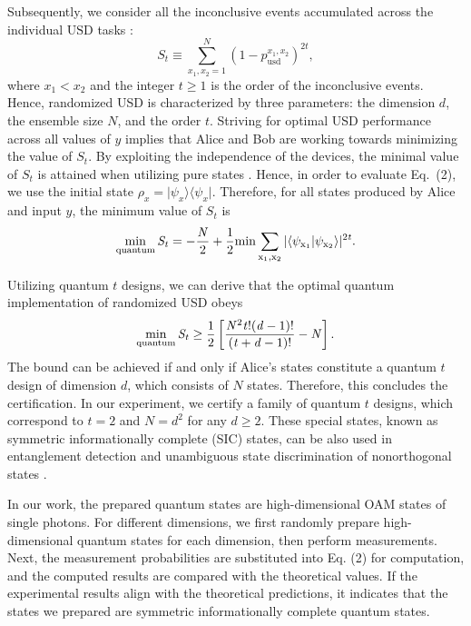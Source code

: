 \documentclass[letterpaper,preprint,superscriptaddress,floatfix,showpacs]{revtex4}
\begin{document}
Subsequently, we consider all the inconclusive events accumulated across the individual $\mathrm{USD}$ tasks \cite{Armin2020}:
\begin{equation}
S_{t}\equiv \sum_{x_{1}, x_{2}=1}^{N}(1-p^{x_{1},x_{2}}_{\mathrm{usd}})^{2t},
\end{equation}
where $x_{1}<x_{2}$ and the integer $t\geq1$ is the order of the inconclusive events. Hence, randomized USD is characterized by three parameters: the dimension $d$, the ensemble size $N$, and the order $t$. Striving for optimal USD performance across all values of $y$ implies that Alice and Bob are working towards minimizing the value of $S_{t}$. By exploiting the independence of the devices, the minimal value of $S_{t}$ is attained when utilizing pure states \cite{Armin2020}. Hence, in order to evaluate Eq.~(2), we use the initial state $\rho_{x}=\vert \psi_{x}\rangle \langle \psi_{x}\vert$. Therefore, for all states produced by Alice and input $y$, the minimum value of $S_{t}$ \cite{Armin2020} is
\begin{equation}
\rm \min\limits_{\text{quantum}}\mathit{S_{t}}=-\dfrac{\mathit{N}}{2}+\dfrac{1}{2}min\sum_{x_{1},x_{2}}|\langle \psi_{x_{1}} \vert \psi_{x_{2}}\rangle|^{2\mathit{t}}.
\end{equation}










Utilizing quantum $t$ designs, we can derive that the optimal quantum implementation of randomized USD obeys
\begin{equation}
\rm \min\limits_{\text{quantum}}\mathit{S_{t}}\geq \dfrac{1}{2}\left[\dfrac{\mathit{N}^{2}\mathit{t}!(\mathit{d}-1)!}{(\mathit{t}+\mathit{d}-1)!}-\mathit{N} \right].
\end{equation}
The bound can be achieved if and only if Alice's states constitute a quantum $t$ design of dimension $d$, which consists of $N$ states. Therefore, this concludes the certification. In our experiment, we certify a family of quantum $t$ designs, which correspond to $t=2$ and $N=d^{2}$ for any $d\geq2$. These special states, known as symmetric informationally complete (SIC) \cite{Renes2004} states, can be also used in entanglement detection \cite{Shang2018} and unambiguous state discrimination of nonorthogonal states \cite{Dieks1988, Peres1988}.




In our work, the prepared quantum states are high-dimensional OAM states of single photons. For different dimensions, we first randomly prepare high-dimensional quantum states for each dimension, then perform measurements. Next, the measurement probabilities are substituted into Eq. (2) for computation, and the computed results are compared with the theoretical values. If the experimental results align with the theoretical predictions, it indicates that the states we prepared are symmetric informationally complete quantum states.
\end{document}
